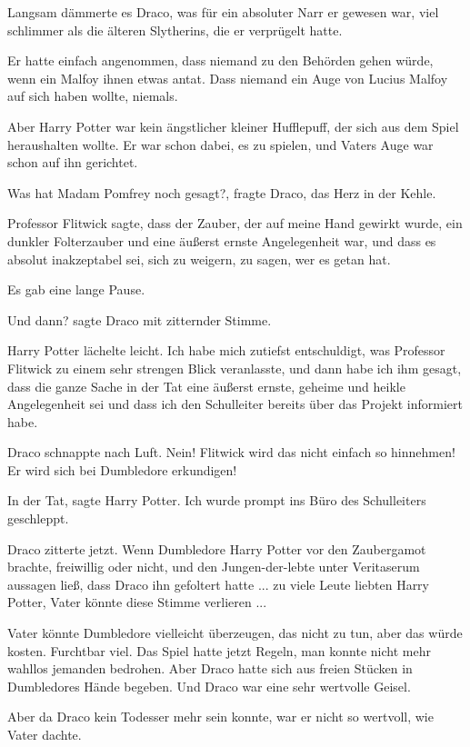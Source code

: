 Langsam dämmerte es Draco, was für ein absoluter Narr er gewesen war, viel
schlimmer als die älteren Slytherins, die er verprügelt hatte.

Er hatte einfach angenommen, dass niemand zu den Behörden gehen würde, wenn ein
Malfoy ihnen etwas antat. Dass niemand ein Auge von Lucius Malfoy auf sich haben
wollte, niemals.

Aber Harry Potter war kein ängstlicher kleiner Hufflepuff, der sich aus dem
Spiel heraushalten wollte. Er war schon dabei, es zu spielen, und Vaters Auge
war schon auf ihn gerichtet.

\glqq{}Was hat Madam Pomfrey noch gesagt?\grqq{}, fragte Draco, das Herz in der
Kehle.

\glqq{}Professor Flitwick sagte, dass der Zauber, der auf meine Hand gewirkt
wurde, ein dunkler Folterzauber und eine äußerst ernste Angelegenheit war, und
dass es absolut inakzeptabel sei, sich zu weigern, zu sagen, wer es getan
hat.\grqq{}

Es gab eine lange Pause.

\glqq{}Und dann?\grqq{} sagte Draco mit zitternder Stimme.

Harry Potter lächelte leicht. \glqq{}Ich habe mich zutiefst entschuldigt, was
Professor Flitwick zu einem sehr strengen Blick veranlasste, und dann habe ich
ihm gesagt, dass die ganze Sache in der Tat eine äußerst ernste, geheime und
heikle Angelegenheit sei und dass ich den Schulleiter bereits über das Projekt
informiert habe.\grqq{}

Draco schnappte nach Luft. \glqq{}Nein! Flitwick wird das nicht einfach so
hinnehmen! Er wird sich bei Dumbledore erkundigen!\grqq{}

\glqq{}In der Tat\grqq{}, sagte Harry Potter. \glqq{}Ich wurde prompt ins Büro
des Schulleiters geschleppt.\grqq{}

Draco zitterte jetzt. Wenn Dumbledore Harry Potter vor den Zaubergamot brachte,
freiwillig oder nicht, und den Jungen-der-lebte unter Veritaserum aussagen ließ,
dass Draco ihn gefoltert hatte ... zu viele Leute liebten Harry Potter, Vater
könnte diese Stimme verlieren ...

Vater könnte Dumbledore vielleicht überzeugen, das nicht zu tun, aber das würde
kosten. Furchtbar viel. Das Spiel hatte jetzt Regeln, man konnte nicht mehr
wahllos jemanden bedrohen. Aber Draco hatte sich aus freien Stücken in
Dumbledores Hände begeben. Und Draco war eine sehr wertvolle Geisel.

Aber da Draco kein Todesser mehr sein konnte, war er nicht so wertvoll, wie
Vater dachte.

